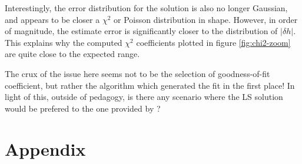 \documentclass{homework}
\begin{document}
\begin{enumerate}[label=\roman*)]
Interestingly, the error distribution for the  solution is also
no longer Gaussian, and appears to be closer a $\chi^2$ or Poisson distribution
in shape.
However, in order of magnitude, the estimate error is significantly closer
to the distribution of $|\delta h|$.
This explains why the computed $\chi^2$ coefficients plotted in figure
\ref{fig:chi2-zoom} are quite close to the expected range. 

The crux of the issue here seems not to be the selection of goodness-of-fit coefficient, but
rather the algorithm which generated the fit in the first place! In light of this, outside of
pedagogy, is there any scenario where the LS solution would be prefered to the one provided
by ?











\end{enumerate}

\section{Appendix}
\end{document}

